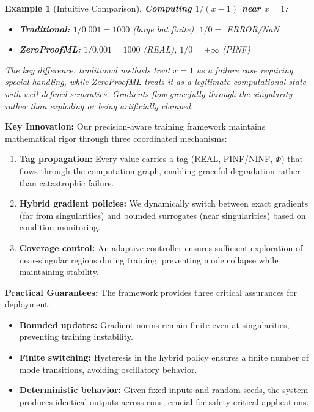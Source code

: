 \documentclass[twoside,11pt]{article}
\newtheorem{examplebox}{Example}[section]
\newcommand{\trReal}{\textsc{REAL}}
\newcommand{\trPINF}{\textsc{PINF}}
\newcommand{\trNINF}{\textsc{NINF}}
\newcommand{\trPHI}{\textsc{$\Phi$}}
\newcommand{\TAGREAL}{\trReal}
\newcommand{\TAGPINF}{\trPINF}
\newcommand{\TAGNINF}{\trNINF}
\newcommand{\TAGPHI}{\trPHI}
\begin{document}
\begin{examplebox}[Intuitive Comparison]
\textbf{Computing $1/(x-1)$ near $x=1$:}
\begin{itemize}
\item \textbf{Traditional:} $1/0.001 = 1000$ (large but finite), $1/0 = $ ERROR/NaN
\item \textbf{ZeroProofML:} $1/0.001 = 1000$ (\TAGREAL), $1/0 = +\infty$ (\TAGPINF)
\end{itemize}
The key difference: traditional methods treat $x=1$ as a failure case requiring special handling, while ZeroProofML treats it as a legitimate computational state with well-defined semantics. Gradients flow gracefully through the singularity rather than exploding or being artificially clamped.
\end{examplebox}

\textbf{Key Innovation:} Our precision-aware training framework maintains mathematical rigor through three coordinated mechanisms:
\begin{enumerate}
\item \textbf{Tag propagation:} Every value carries a tag (\TAGREAL, \TAGPINF/\TAGNINF, \TAGPHI) that flows through the computation graph, enabling graceful degradation rather than catastrophic failure.
\item \textbf{Hybrid gradient policies:} We dynamically switch between exact gradients (far from singularities) and bounded surrogates (near singularities) based on condition monitoring.
\item \textbf{Coverage control:} An adaptive controller ensures sufficient exploration of near-singular regions during training, preventing mode collapse while maintaining stability.
\end{enumerate}

\textbf{Practical Guarantees:} The framework provides three critical assurances for deployment:
\begin{itemize}
\item \textbf{Bounded updates:} Gradient norms remain finite even at singularities, preventing training instability.
\item \textbf{Finite switching:} Hysteresis in the hybrid policy ensures a finite number of mode transitions, avoiding oscillatory behavior.
\item \textbf{Deterministic behavior:} Given fixed inputs and random seeds, the system produces identical outputs across runs, crucial for safety-critical applications.
\end{itemize}
\end{document}
